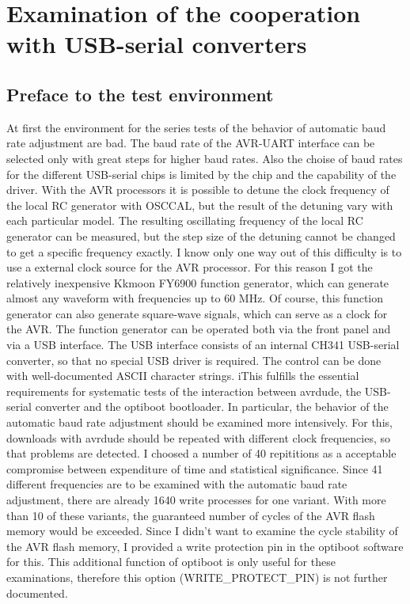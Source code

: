 \section{Examination of the cooperation with USB-serial converters}

\subsection{Preface to the test environment}
At first the environment for the series tests of the behavior of automatic baud rate adjustment
are bad. The baud rate of the AVR-UART interface can be selected only with great steps for
higher baud rates. Also the choise of baud rates for the different USB-serial chips is limited
by the chip and the capability of the driver.
With the AVR processors it is possible to detune the clock frequency of the local RC generator
with OSCCAL, but the result of the detuning vary with each particular model.
The resulting oscillating frequency of the local RC generator can be measured,
but the step size of the detuning cannot be changed to get a specific frequency exactly.
I know only one way out of this difficulty is to use a external clock source for the AVR processor.
For this reason I got the relatively inexpensive Kkmoon FY6900 function generator,
which can generate almost any waveform with frequencies up to 60 MHz.
Of course, this function generator can also generate square-wave signals, which can serve as
a clock for the AVR.
The function generator can be operated both via the front panel and via a USB interface.
The USB interface consists of an internal CH341 USB-serial converter, so that no special USB driver is required.
The control can be done with well-documented ASCII character strings.
iThis fulfills the essential requirements for systematic tests of the interaction between avrdude,
the USB-serial converter and the optiboot bootloader.
In particular, the behavior of the automatic baud rate adjustment should be examined more intensively.
For this, downloads with avrdude should be repeated with different clock frequencies,
so that problems are detected.
I choosed a number of 40 repititions as a acceptable compromise between expenditure of time and
statistical significance.
Since 41 different frequencies are to be examined with the automatic baud rate adjustment,
there are already 1640 write processes for one variant.
With more than 10 of these variants, the guaranteed number of cycles of the AVR flash memory would be exceeded.
Since I didn't want to examine the cycle stability of the AVR flash memory,
I provided a write protection pin in the optiboot software for this.
This additional function of optiboot is only useful for these examinations, therefore this
option (WRITE\_PROTECT\_PIN) is not further documented.

